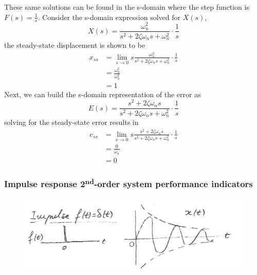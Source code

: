 \documentclass[12pt,letter]{article}
\numberwithin{ex}{section} %
\numberwithin{re}{section} %
\numberwithin{equation}{section}	%
\begin{document}
These same solutions can be found in the s-domain where the step function is $F(s)=\frac{1}{s}$. Consider the s-domain expression solved for $X(s)$, 
\begin{equation}
X(s) = \frac{\omega_n^2}{s^2 + 2 \zeta \omega_n s + \omega_n^2} \cdot \frac{1}{s} 
\end{equation}
the steady-state displacement is shown to be
\begin{align}
x_{ss} &= \lim\limits_{s \rightarrow 0} s \frac{\omega_n^2}{s^2 + 2 \zeta \omega_n s + \omega_n^2} \cdot \frac{1}{s} \\
&= \frac{\omega_n^2}{\omega_n^2}   \nonumber \\
&= 1    \nonumber 
\end{align}
Next, we can build the s-domain representation of the error as
\begin{equation}
E(s) = \frac{s^2 + 2 \zeta \omega_n s}{s^2 + 2 \zeta \omega_n s + \omega_n^2} \cdot \frac{1}{s}
\end{equation}
solving for the steady-state error results in
\begin{align}
e_{ss} &= \lim\limits_{s \rightarrow 0} s  \frac{s^2 + 2 \zeta \omega_n s}{s^2 + 2 \zeta \omega_n s + \omega_n^2} \cdot \frac{1}{s} \\
&= \frac{0}{\omega_n}   \nonumber \\
&= 0   \nonumber 
\end{align}

\subsubsection{Impulse response 2\textsuperscript{nd}-order system performance indicators}

\begin{figure}[H]
	\centering
	\includegraphics[width=6.5in]{../figures/impulse_response_2nd_order_with_steady_state_error}
\end{figure}
\end{document}
